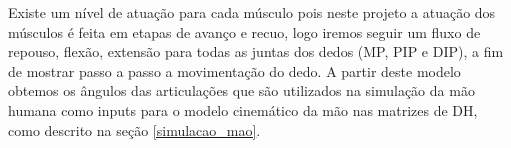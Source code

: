 Existe um nível de atuação para cada músculo pois neste projeto a atuação dos músculos é feita em etapas de avanço e recuo, logo iremos seguir um fluxo de repouso, flexão, extensão para todas as juntas dos dedos (MP, PIP e DIP), a fim de mostrar passo a passo a movimentação do dedo. A partir deste modelo obtemos os ângulos das articulações que são utilizados na simulação da mão humana como inputs para o modelo cinemático da mão nas matrizes de DH, como descrito na seção \ref{simulacao_mao}. 
